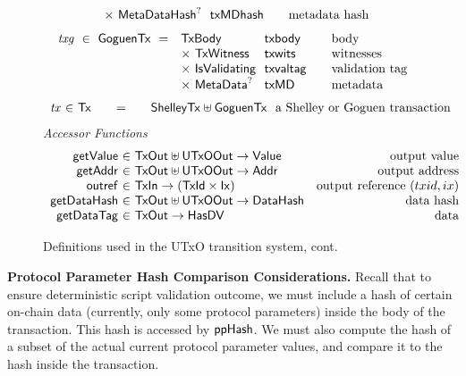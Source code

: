 \begin{figure*}[htb]
\begin{equation*}
\begin{array}{r@{~~}l@{~~}l@{\qquad}l}
       & \times ~\MetaDataHash^? & \fun{txMDhash} & \text{metadata hash}\\
    \end{array}
  \end{equation*}
  \begin{equation*}
    \begin{array}{r@{~~}l@{~~}l@{\qquad}l}
      \var{txg} ~\in~ \GoguenTx ~=~
      & \TxBody & \fun{txbody} & \text{body}\\
      & \times ~\TxWitness & \fun{txwits} & \text{witnesses}\\
      & \times ~\IsValidating & \fun{txvaltag}&\text{validation tag}\\
      & \times ~\MetaData^? & \fun{txMD}&\text{metadata}\\
    \end{array}
  \end{equation*}
  \begin{equation*}
    \begin{array}{r@{~\in~}l@{\qquad=\qquad}lr}
      \var{tx} & \Tx & \ShelleyTx \uniondistinct \GoguenTx
      \text{~~a Shelley or Goguen transaction}\\
    \end{array}
  \end{equation*}
  \emph{Accessor Functions}
  \begin{equation*}
    \begin{array}{r@{~\in~}lr}
      \fun{getValue} & \TxOut \uniondistinct \UTxOOut \to \Value & \text{output value} \\
      \fun{getAddr} & \TxOut \uniondistinct \UTxOOut \to \Addr & \text{output address} \\
      \fun{outref} & \TxIn \to (\TxId \times \Ix) & \text{output reference $(txid,ix)$} \\
      \fun{getDataHash} & \TxOut \uniondistinct \UTxOOut \to \DataHash & \text{data hash} \\
      \fun{getDataTag} & \TxOut \to \HasDV & \text{data} \\
    \end{array}
  \end{equation*}
  \caption{Definitions used in the UTxO transition system, cont.}
  \label{fig:defs:utxo-shelley-2}
\end{figure*}

\textbf{Protocol Parameter Hash Comparison Considerations.}
Recall that to ensure deterministic script validation outcome, we must include
a hash of certain on-chain data (currently, only some protocol parameters)
inside the body of the transaction. This hash is accessed by $\mathsf{ppHash}$.
We must also compute the hash of a subset of the actual current protocol parameter values,
and compare it to the hash inside the transaction.

